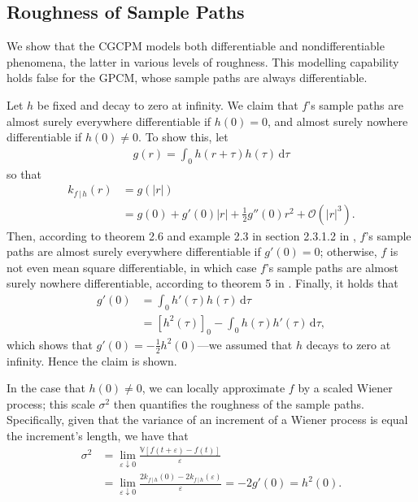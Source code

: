 \documentclass{article}
\newcommand{\e}{\varepsilon}   %
\renewcommand{\O}{\mathcal{O}} %
\newcommand{\id}[1]{\, \mathrm{d} #1}     %
\newcommand{\cond}{\, | \,}               %
\renewcommand{\ll}{\left}
\newcommand{\rr}{\right}
\begin{document}
\subsection{Roughness of Sample Paths}
We show that the CGCPM models both differentiable and nondifferentiable phenomena, the latter in various levels of roughness. This modelling capability holds false for the GPCM, whose sample paths are always differentiable.

Let $h$ be fixed and decay to zero at infinity. We claim that $f$'s sample paths are almost surely everywhere differentiable if $h(0)=0$, and almost surely nowhere differentiable if $h(0)\neq 0$. To show this, let
\begin{align*}
    g(r) = \int_0 h(r + \tau) h(\tau) \id{\tau}
\end{align*}
so that
\begin{align*}
    k_{f\cond h}(r)
    &= g(|r|) \\
    &= g(0) + g'(0)|r| + \frac{1}{2}g''(0)r^2 + \O(|r|^3).
\end{align*}
Then, according to theorem 2.6 and example 2.3 in section 2.3.1.2 in \cite{Lindgren:2006:Lectures_on_Stationary_Stochastic_Processes}, $f$'s sample paths are almost surely everywhere differentiable if $g'(0)=0$; otherwise, $f$ is not even mean square differentiable, in which case $f$'s sample paths are almost surely nowhere differentiable, according to theorem 5 in \cite{Cambanis:1973:On_Some_Continuity_and_Differentiability}. Finally, it holds that
\begin{align*}
    g'(0)
    &= \int_0 h'(\tau) h(\tau) \id{\tau} \\
    &= \ll[ h^2(\tau)\rr]_0 - \int_0 h(\tau) h'(\tau) \id{\tau},
\end{align*}
which shows that $g'(0) = -\frac{1}{2} h^2(0)$---we assumed that $h$ decays to zero at infinity. Hence the claim is shown.

In the case that $h(0)\neq 0$, we can locally approximate $f$ by a scaled Wiener process; this scale $\sigma^2$ then quantifies the roughness of the sample paths. Specifically, given that the variance of an increment of a Wiener process is equal the increment's length, we have that
\begin{align*}
    \sigma^2
    &= \lim_{\e \downarrow 0} \frac{\mathbb{V}[f(t+\e)-f(t)]}{\e} \\
    &= \lim_{\e \downarrow 0} \frac{2k_{f\cond h}(0) - 2k_{f\cond h}(\e)}{\e}
    = -2g'(0)
    = h^2(0).
\end{align*}
\end{document}
